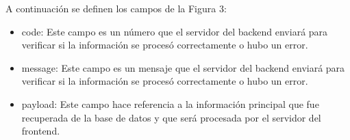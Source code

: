A continuación se definen los campos de la Figura 3:
\begin{itemize}
    \item code: Este campo es un número que el servidor del backend enviará para verificar si la información se procesó correctamente o hubo un error.
    \item message: Este campo es un mensaje que el servidor del backend enviará para verificar si la información se procesó correctamente o hubo un error.
    \item payload: Este campo hace referencia a la información principal que fue recuperada de la base de datos y que será procesada por el servidor del frontend.
\end{itemize}

